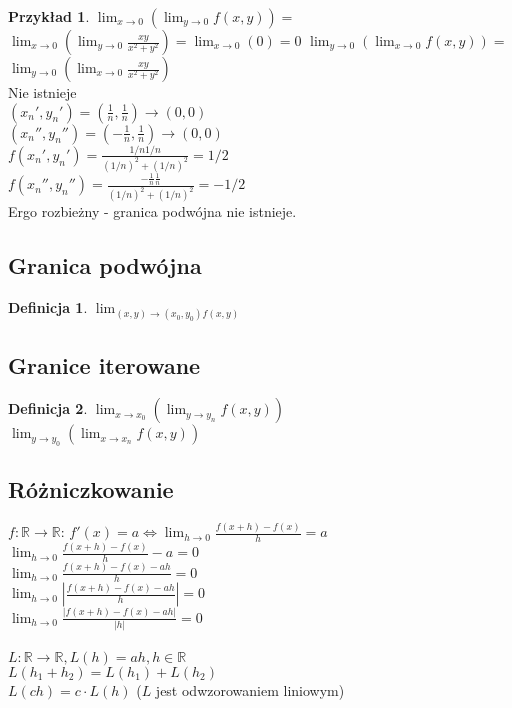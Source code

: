 \documentclass{article}
\theoremstyle{definition}
\newtheorem{de}{Definicja}[subsection]
\theoremstyle{definition}
\theoremstyle{definition}
\newtheorem{pk}{Przykład}[subsection]
\theoremstyle{definition}
\begin{document}
\begin{pk}
    $\lim_{x\rightarrow 0} (\lim_{y\rightarrow 0} f(x,y)) =$\\
    $\lim_{x\rightarrow 0} (\lim_{y\rightarrow 0} \frac{xy}{x^2+y^2}) = \lim_{x\rightarrow 0} (0) = 0$
    $\lim_{y\rightarrow 0} (\lim_{x\rightarrow 0} f(x,y)) =$\\
    $\lim_{y\rightarrow 0} (\lim_{x\rightarrow 0} \frac{xy}{x^2+y^2})$\\
    Nie istnieje\\
    $(x_n', y_n') = (\frac{1}{n}, \frac{1}{n}) \rightarrow (0,0)$\\
    $(x_n'', y_n'') = (-\frac{1}{n}, \frac{1}{n}) \rightarrow (0,0)$\\
    $f(x_n', y_n') = \frac{1/n 1/n}{(1/n)^2 + (1/n)^2} = 1/2$\\
    $f(x_n'', y_n'') = \frac{-\frac{1}{n}\frac{1}{n}}{(1/n)^2 + (1/n)^2}=-1/2$\\
    Ergo rozbieżny - granica podwójna nie istnieje.
\end{pk}

\subsection{Granica podwójna}

\begin{de}
    $\lim_{(x,y)\rightarrow(x_0,y_0) f(x,y)}$
\end{de}

\subsection{Granice iterowane}

\begin{de}
    $\lim_{x\rightarrow x_0} (\lim_{y\rightarrow y_n} f(x,y))$\\
    $\lim_{y\rightarrow y_0} (\lim_{x\rightarrow x_n} f(x,y))$
\end{de}

\subsection{Różniczkowanie}

$f: \mathbb{R} \rightarrow \mathbb{R}$:
$f'(x) = a \iff \lim_{h\rightarrow 0} \frac{f(x+h)-f(x)}{h}=a$\\
$\lim_{h\rightarrow 0} \frac{f(x+h)-f(x)}{h} - a = 0$\\
$\lim_{h\rightarrow 0} \frac{f(x+h)-f(x)-ah}{h} = 0$\\
$\lim_{h\rightarrow 0} \left|\frac{f(x+h)-f(x)-ah}{h}\right| = 0$\\
$\lim_{h\rightarrow 0} \frac{|f(x+h)-f(x)-ah|}{|h|} = 0$\\\\
$L: \mathbb{R} \rightarrow \mathbb{R}, L(h)= ah, h\in\mathbb{R}$\\
$L(h_1+h_2) = L(h_1) + L(h_2)$\\
$L(ch)=c\cdot L(h)$ ($L$ jest odwzorowaniem liniowym)\\
\end{document}
